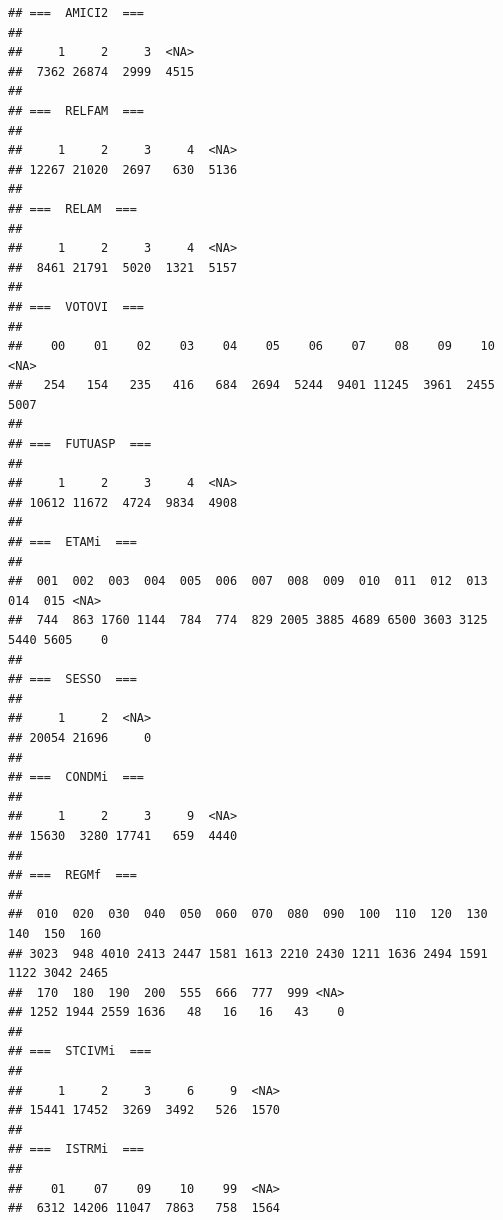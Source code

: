 \documentclass[
]{article}
\newenvironment{Shaded}{\begin{snugshade}}{\end{snugshade}}
\newcommand{\CommentTok}[1]{\textcolor[rgb]{0.56,0.35,0.01}{\textit{#1}}}
\newcommand{\ConstantTok}[1]{\textcolor[rgb]{0.56,0.35,0.01}{#1}}
\newcommand{\DecValTok}[1]{\textcolor[rgb]{0.00,0.00,0.81}{#1}}
\newcommand{\FunctionTok}[1]{\textcolor[rgb]{0.13,0.29,0.53}{\textbf{#1}}}
\newcommand{\NormalTok}[1]{#1}
\newcommand{\OtherTok}[1]{\textcolor[rgb]{0.56,0.35,0.01}{#1}}
\newcommand{\SpecialCharTok}[1]{\textcolor[rgb]{0.81,0.36,0.00}{\textbf{#1}}}
\newcommand{\StringTok}[1]{\textcolor[rgb]{0.31,0.60,0.02}{#1}}
\begin{document}
\begin{verbatim}
## ===  AMICI2  ===
## 
##     1     2     3  <NA> 
##  7362 26874  2999  4515 
## 
## ===  RELFAM  ===
## 
##     1     2     3     4  <NA> 
## 12267 21020  2697   630  5136 
## 
## ===  RELAM  ===
## 
##     1     2     3     4  <NA> 
##  8461 21791  5020  1321  5157 
## 
## ===  VOTOVI  ===
## 
##    00    01    02    03    04    05    06    07    08    09    10  <NA> 
##   254   154   235   416   684  2694  5244  9401 11245  3961  2455  5007 
## 
## ===  FUTUASP  ===
## 
##     1     2     3     4  <NA> 
## 10612 11672  4724  9834  4908 
## 
## ===  ETAMi  ===
## 
##  001  002  003  004  005  006  007  008  009  010  011  012  013  014  015 <NA> 
##  744  863 1760 1144  784  774  829 2005 3885 4689 6500 3603 3125 5440 5605    0 
## 
## ===  SESSO  ===
## 
##     1     2  <NA> 
## 20054 21696     0 
## 
## ===  CONDMi  ===
## 
##     1     2     3     9  <NA> 
## 15630  3280 17741   659  4440 
## 
## ===  REGMf  ===
## 
##  010  020  030  040  050  060  070  080  090  100  110  120  130  140  150  160 
## 3023  948 4010 2413 2447 1581 1613 2210 2430 1211 1636 2494 1591 1122 3042 2465 
##  170  180  190  200  555  666  777  999 <NA> 
## 1252 1944 2559 1636   48   16   16   43    0 
## 
## ===  STCIVMi  ===
## 
##     1     2     3     6     9  <NA> 
## 15441 17452  3269  3492   526  1570 
## 
## ===  ISTRMi  ===
## 
##    01    07    09    10    99  <NA> 
##  6312 14206 11047  7863   758  1564
\end{verbatim}

\begin{Shaded}
\end{Shaded}
\end{document}
